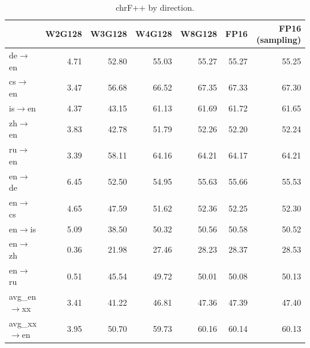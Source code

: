 \begin{table}[t]
\centering
\small
\begin{tabular}{lrrrrrr}
\toprule
& W2G128 & W3G128 & W4G128 & W8G128 & FP16 & FP16 (sampling) \\
\midrule
de$\rightarrow$en & 4.71 & 52.80 & 55.03 & 55.27 & 55.27 & 55.25 \\
cs$\rightarrow$en & 3.47 & 56.68 & 66.52 & 67.35 & 67.33 & 67.30 \\
is$\rightarrow$en & 4.37 & 43.15 & 61.13 & 61.69 & 61.72 & 61.65 \\
zh$\rightarrow$en & 3.83 & 42.78 & 51.79 & 52.26 & 52.20 & 52.24 \\
ru$\rightarrow$en & 3.39 & 58.11 & 64.16 & 64.21 & 64.17 & 64.21 \\
en$\rightarrow$de & 6.45 & 52.50 & 54.95 & 55.63 & 55.66 & 55.53 \\
en$\rightarrow$cs & 4.65 & 47.59 & 51.62 & 52.36 & 52.25 & 52.30 \\
en$\rightarrow$is & 5.09 & 38.50 & 50.32 & 50.56 & 50.58 & 50.52 \\
en$\rightarrow$zh & 0.36 & 21.98 & 27.46 & 28.23 & 28.37 & 28.53 \\
en$\rightarrow$ru & 0.51 & 45.54 & 49.72 & 50.01 & 50.08 & 50.13 \\
\midrule
avg\_en$\rightarrow$xx & 3.41 & 41.22 & 46.81 & 47.36 & 47.39 & 47.40 \\
avg\_xx$\rightarrow$en & 3.95 & 50.70 & 59.73 & 60.16 & 60.14 & 60.13 \\
\bottomrule
\end{tabular}
\caption{chrF++ by direction.}
\label{tab:chrf}
\end{table}

